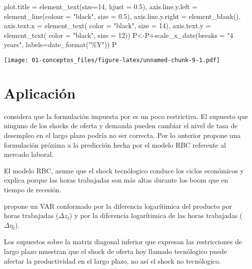 \documentclass[
]{book}
\newenvironment{Shaded}{\begin{snugshade}}{\end{snugshade}}
\newcommand{\AttributeTok}[1]{\textcolor[rgb]{0.77,0.63,0.00}{#1}}
\newcommand{\DecValTok}[1]{\textcolor[rgb]{0.00,0.00,0.81}{#1}}
\newcommand{\FloatTok}[1]{\textcolor[rgb]{0.00,0.00,0.81}{#1}}
\newcommand{\FunctionTok}[1]{\textcolor[rgb]{0.00,0.00,0.00}{#1}}
\newcommand{\NormalTok}[1]{#1}
\newcommand{\OtherTok}[1]{\textcolor[rgb]{0.56,0.35,0.01}{#1}}
\newcommand{\SpecialCharTok}[1]{\textcolor[rgb]{0.00,0.00,0.00}{#1}}
\newcommand{\StringTok}[1]{\textcolor[rgb]{0.31,0.60,0.02}{#1}}
\begin{document}
\begin{Shaded}
\begin{Highlighting}[]
           \AttributeTok{plot.title =} \FunctionTok{element\_text}\NormalTok{(}\AttributeTok{size=}\DecValTok{14}\NormalTok{, }\AttributeTok{hjust =} \FloatTok{0.5}\NormalTok{),}
           \AttributeTok{axis.line.y.left  =} \FunctionTok{element\_line}\NormalTok{(}\AttributeTok{colour =} \StringTok{"black"}\NormalTok{, }\AttributeTok{size =} \FloatTok{0.5}\NormalTok{),}
           \AttributeTok{axis.line.y.right =} \FunctionTok{element\_blank}\NormalTok{(),}
           \AttributeTok{axis.text.x =} \FunctionTok{element\_text}\NormalTok{( }\AttributeTok{color =} \StringTok{"black"}\NormalTok{, }\AttributeTok{size =} \DecValTok{14}\NormalTok{),}
           \AttributeTok{axis.text.y =} \FunctionTok{element\_text}\NormalTok{( }\AttributeTok{color =} \StringTok{"black"}\NormalTok{, }\AttributeTok{size =} \DecValTok{12}\NormalTok{))}
\NormalTok{P}\OtherTok{\textless{}{-}}\NormalTok{P}\SpecialCharTok{+}\FunctionTok{scale\_x\_date}\NormalTok{(}\AttributeTok{breaks =} \StringTok{"4 years"}\NormalTok{, }\AttributeTok{labels=}\FunctionTok{date\_format}\NormalTok{(}\StringTok{"\%Y"}\NormalTok{))}
\NormalTok{P}
\end{Highlighting}
\end{Shaded}

\texttt{[image: 01-conceptos\_files/figure-latex/unnamed-chunk-9-1.pdf]}

\hypertarget{aplicaciuxf3n-gali99}{%
\section{\texorpdfstring{Aplicación \citet{GALI99}}{Aplicación @GALI99}}\label{aplicaciuxf3n-gali99}}

\citet{GALI99} considera que la formulación impuesta por \citet{BLANCHARD88} es un poco restrictiva. El supuesto que ninguno de los shocks de oferta y demanda pueden cambiar el nivel de tasa de desempleo en el largo plazo podría no ser correcta. Por lo anterior propone una formulación próxima a la predicción hecha por el modelo RBC referente al mercado laboral.

El modelo RBC, asume que el shock tecnólogico conduce los ciclos económicos y explica porque las horas trabajadas son más altas durante los boom que en tiempo de recesión.

\citet{GALI99} propone un VAR conformado por la diferencia logarítimica del producto por horas trabajadas (\(\Delta z_{t}\)) y por la diferencia logarítimica de las horas trabajadas (\(\Delta \eta_{t}\)).

Los supuestos sobre la matriz diagonal inferior que expresan las restricciones de largo plazo muestran que el shock de oferta hoy llamado tecnólogico puede afectar la productividad en el largo plazo, no así el shock no tecnólogico.
\end{document}
